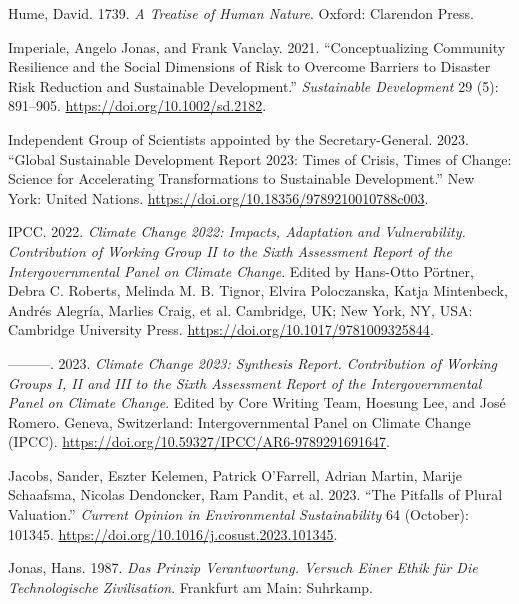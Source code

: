 \documentclass[
  a4paper,
  openany]{book}
\newlength{\cslhangindent}
\newenvironment{CSLReferences}[2] %
 {\begin{list}{}{%
  \setlength{\itemindent}{0pt}
  \setlength{\leftmargin}{0pt}
  \setlength{\parsep}{0pt}
  \ifodd #1
   \setlength{\leftmargin}{\cslhangindent}
   \setlength{\itemindent}{-1\cslhangindent}
  \fi
  \setlength{\itemsep}{#2\baselineskip}}}
 {\end{list}}
\begin{document}
\begin{CSLReferences}{1}{0}
Hume, David. 1739. \emph{A {Treatise} of {Human Nature}}. Oxford:
Clarendon Press.

Imperiale, Angelo Jonas, and Frank Vanclay. 2021. {``Conceptualizing
Community Resilience and the Social Dimensions of Risk to Overcome
Barriers to Disaster Risk Reduction and Sustainable Development.''}
\emph{Sustainable Development} 29 (5): 891--905.
\url{https://doi.org/10.1002/sd.2182}.

Independent Group of Scientists appointed by the Secretary-General.
2023. {``Global {Sustainable Development Report} 2023: {Times} of
Crisis, Times of Change: {Science} for Accelerating Transformations to
Sustainable Development.''} New York: United Nations.
\url{https://doi.org/10.18356/9789210010788c003}.

IPCC. 2022. \emph{Climate {Change} 2022: {Impacts}, Adaptation and
Vulnerability. {Contribution} of {Working Group II} to the {Sixth
Assessment Report} of the {Intergovernmental Panel} on {Climate
Change}}. Edited by Hans-Otto Pörtner, Debra C. Roberts, Melinda M. B.
Tignor, Elvira Poloczanska, Katja Mintenbeck, Andrés Alegría, Marlies
Craig, et al. Cambridge, UK; New York, NY, USA: Cambridge University
Press. \url{https://doi.org/10.1017/9781009325844}.

---------. 2023. \emph{Climate {Change} 2023: {Synthesis Report}.
{Contribution} of {Working Groups I}, {II} and {III} to the {Sixth
Assessment Report} of the {Intergovernmental Panel} on {Climate
Change}}. Edited by Core Writing Team, Hoesung Lee, and José Romero.
Geneva, Switzerland: Intergovernmental Panel on Climate Change (IPCC).
\url{https://doi.org/10.59327/IPCC/AR6-9789291691647}.

Jacobs, Sander, Eszter Kelemen, Patrick O'Farrell, Adrian Martin, Marije
Schaafsma, Nicolas Dendoncker, Ram Pandit, et al. 2023. {``The Pitfalls
of Plural Valuation.''} \emph{Current Opinion in Environmental
Sustainability} 64 (October): 101345.
\url{https://doi.org/10.1016/j.cosust.2023.101345}.

Jonas, Hans. 1987. \emph{Das {Prinzip Verantwortung}. {Versuch} Einer
{Ethik} f{ü}r Die Technologische {Zivilisation}}. Frankfurt am Main:
Suhrkamp.


\end{CSLReferences}
\end{document}
